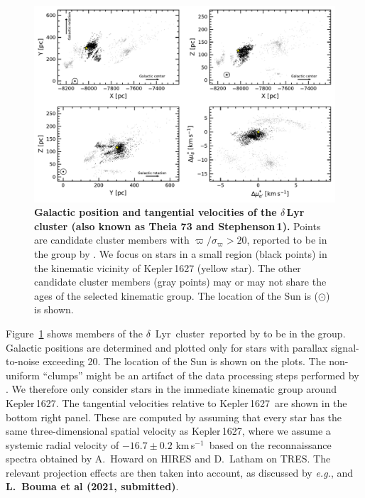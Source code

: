 \documentclass[12pt,modern,tighten]{aastex63}
\newcommand{\cn}{$\delta$~Lyr\ cluster} %
\newcommand{\sn}{Kepler\,1627} %
\newcommand{\kms}{\,km\,s$^{-1}$}
\begin{document}
\begin{figure}[t]
	\begin{center}
		\leavevmode
		\includegraphics[width=1\textwidth]{f1.pdf}
	\end{center}
	\vspace{-0.7cm}
	\caption{
		{\bf Galactic position and tangential velocities of the
			$\delta$\,Lyr cluster (also known as Theia 73 and Stephenson\,1).}  Points are
		candidate cluster members with $\varpi/\sigma_\varpi > 20$, reported
		to be in the group by \citet{kounkel_untangling_2019}.  We focus
		on stars in a small region (black points) in the kinematic
		vicinity of Kepler\,1627 (yellow star).  The other candidate cluster
		members (gray points) may or may not share the ages of the selected
		kinematic group.  The location of the Sun is ($\odot$) is shown.
		\label{fig:XYZvtang}
	}
\end{figure}

Figure~\ref{fig:XYZvtang} shows members of the \cn\
reported
by \citet{kounkel_untangling_2019} to be in the group.
Galactic positions are determined and plotted only for stars with parallax
signal-to-noise exceeding 20.
The location of the Sun is shown on the plots.
The non-uniform ``clumps'' might be
an artifact of the data processing steps performed by \citet{kounkel_untangling_2019}.
We therefore only consider stars in the immediate kinematic group
around \sn. 
The tangential velocities relative to \sn\ are shown in the bottom right panel.
These are computed by assuming that every star has the same three-dimensional
spatial velocity as \sn, where we assume a systemic radial velocity of
$-16.7 \pm 0.2$\,\kms\ based on the reconnaissance spectra obtained by
A.~Howard on HIRES and D.~Latham on TRES.
The relevant projection effects are then taken into account,
as discussed by {\it e.g.}, \citet{Meingast2021} and {\bf L.~Bouma et al (2021, submitted)}.
\end{document}
